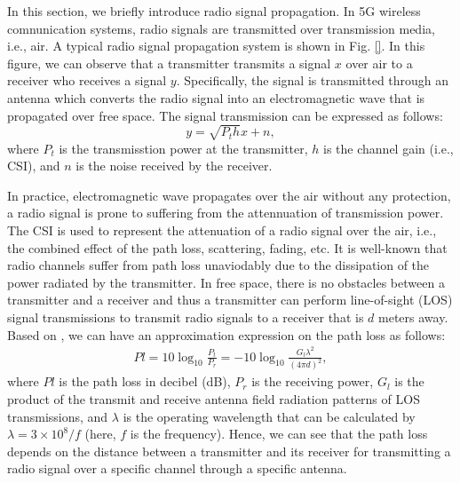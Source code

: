 \documentclass[10pt,journal,cspaper,compsoc]{IEEEtran}
\begin{document}
In this section, we briefly introduce radio signal propagation. In 5G wireless comnunication systems, radio signals are transmitted over transmission media, i.e., air. A typical radio signal propagation system is shown in Fig. \ref{}. In this figure, we can observe that a transmitter transmits a signal $x$ over air to a receiver who receives a signal $y$. Specifically, the signal is transmitted through an antenna which converts the radio signal into an electromagnetic wave that is propagated over free space. The signal transmission can be expressed as follows:
\begin{equation}
y = \sqrt{P_{t}h}x + n,
\end{equation}
where $P_{t}$ is the transmisstion power at the transmitter, $h$ is the channel gain (i.e., CSI), and $n$ is the noise received by the receiver.

In practice, electromagnetic wave propagates over the air without any protection, a radio signal is prone to suffering from the attennuation of transmission power. The CSI is used to represent the attenuation of a radio signal over the air, i.e., the combined effect of the path loss, scattering, fading, etc. It is well-known that radio channels suffer from path loss unaviodably due to the dissipation of the power radiated by the transmitter. In free space, there is no obstacles between a transmitter and a receiver and thus a transmitter can perform line-of-sight (LOS) signal transmissions to transmit radio signals to a receiver that is $d$ meters away. Based on \cite{Par94}, we can have an approximation expression on the path loss as follows:
\begin{eqnarray}
Pl = 10 \log_{10}\frac{P_{t}}{P_{r}} = -10\log_{10}\frac{G_{l}\lambda^{2}}{(4\pi d)^{2}},
\end{eqnarray}
where $Pl$ is the path loss in decibel (dB), $P_{r}$ is the receiving power, $G_{l}$ is the product of the transmit and receive antenna field radiation patterns of LOS transmissions, and $\lambda$ is the operating wavelength that can be calculated by $\lambda = 3\times 10^{8}/f$ (here, $f$ is the frequency). Hence, we can see that the path loss depends on the distance between a transmitter and its receiver for transmitting a radio signal over a specific channel through a specific antenna.
\end{document}
